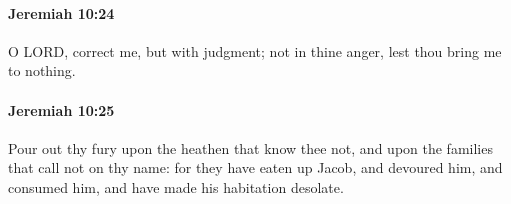 		\paragraph{Jeremiah 10:24} %
			\label{JEREMIAH-10-24}

			O LORD, correct me, but with judgment; not in thine anger, lest thou bring me to nothing.


		\paragraph{Jeremiah 10:25} %
			\label{JEREMIAH-10-25}

			Pour out thy fury upon the heathen that know thee not, and upon the families that call not on thy name: for they have eaten up Jacob, and devoured him, and consumed him, and have made his habitation desolate.

